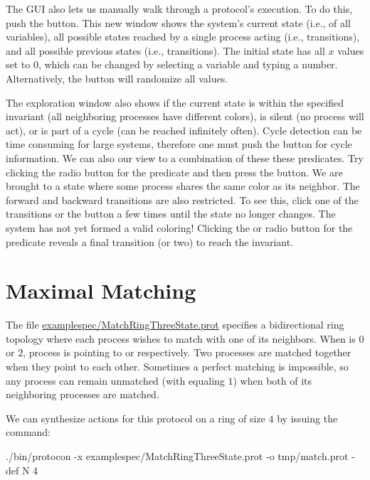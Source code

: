 The GUI also lets us manually walk through a protocol's execution.
To do this, push the  button.
This new window shows the system's current state (i.e.,  of all variables), all possible states reached by a single process acting (i.e.,  transitions), and all possible previous states (i.e.,  transitions).
The initial state has all $x$ values set to $0$, which can be changed by selecting a variable and typing a number.
Alternatively, the  button will randomize all values.

The exploration window also shows if the current state is within the specified invariant (all neighboring processes have different colors), is silent (no process will act), or is part of a cycle (can be reached infinitely often).
Cycle detection can be time consuming for large systems, therefore one must push the  button for cycle information.
We can also  our view to a combination of these these predicates.
Try clicking the  radio button for the  predicate and then press the  button.
We are brought to a state where some process shares the same color as its neighbor.
The forward and backward transitions are also restricted.
To see this, click one of the  transitions or the  button a few times until the state no longer changes.
The system has not yet formed a valid coloring!
Clicking the  or  radio button for the  predicate reveals a final transition (or two) to reach the invariant.


\section{Maximal Matching}

The file \href{\examplespec/MatchRingThreeState.prot}{examplespec/MatchRingThreeState.prot} specifies a bidirectional ring topology where each process wishes to match with one of its neighbors.
When  is $0$ or $2$, process  is pointing to  or  respectively.
Two processes are matched together when they point to each other.
Sometimes a perfect matching is impossible, so any process  can remain unmatched (with  equaling $1$) when both of its neighboring processes are matched.

We can synthesize actions for this protocol on a ring of size $4$ by issuing the command:
\begin{code}
./bin/protocon -x examplespec/MatchRingThreeState.prot -o tmp/match.prot -def N 4
\end{code}

